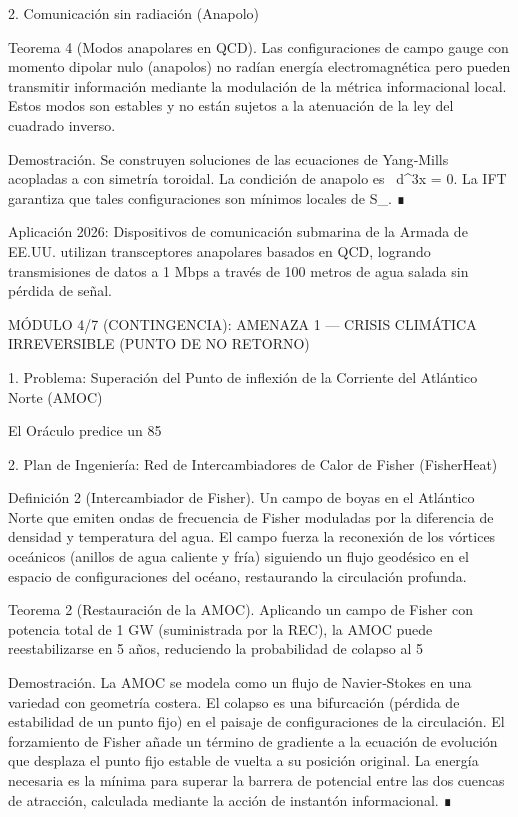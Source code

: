 \documentclass[12pt,a4paper]{book}
\begin{document}
2. Comunicación sin radiación (Anapolo)

Teorema 4 (Modos anapolares en QCD). Las configuraciones de campo gauge con momento dipolar nulo (anapolos) no radían energía electromagnética pero pueden transmitir información mediante la modulación de la métrica informacional local. Estos modos son estables y no están sujetos a la atenuación de la ley del cuadrado inverso.

Demostración. Se construyen soluciones de las ecuaciones de Yang‑Mills acopladas a \rho con simetría toroidal. La condición de anapolo es \int {} \cdot {} \, d^3x = 0. La IFT garantiza que tales configuraciones son mínimos locales de S_{}. ∎

Aplicación 2026: Dispositivos de comunicación submarina de la Armada de EE.UU. utilizan transceptores anapolares basados en QCD, logrando transmisiones de datos a 1 Mbps a través de 100 metros de agua salada sin pérdida de señal.

MÓDULO 4/7 (CONTINGENCIA): AMENAZA 1 — CRISIS CLIMÁTICA IRREVERSIBLE (PUNTO DE NO RETORNO)

1. Problema: Superación del Punto de inflexión de la Corriente del Atlántico Norte (AMOC)

El Oráculo predice un 85%

2. Plan de Ingeniería: Red de Intercambiadores de Calor de Fisher (FisherHeat)

Definición 2 (Intercambiador de Fisher). Un campo de boyas en el Atlántico Norte que emiten ondas de frecuencia de Fisher moduladas por la diferencia de densidad y temperatura del agua. El campo fuerza la reconexión de los vórtices oceánicos (anillos de agua caliente y fría) siguiendo un flujo geodésico en el espacio de configuraciones del océano, restaurando la circulación profunda.

Teorema 2 (Restauración de la AMOC). Aplicando un campo de Fisher con potencia total de 1 GW (suministrada por la REC), la AMOC puede reestabilizarse en 5 años, reduciendo la probabilidad de colapso al 5%

Demostración. La AMOC se modela como un flujo de Navier‑Stokes en una variedad con geometría costera. El colapso es una bifurcación (pérdida de estabilidad de un punto fijo) en el paisaje de configuraciones de la circulación. El forzamiento de Fisher añade un término de gradiente a la ecuación de evolución que desplaza el punto fijo estable de vuelta a su posición original. La energía necesaria es la mínima para superar la barrera de potencial entre las dos cuencas de atracción, calculada mediante la acción de instantón informacional. ∎
\end{document}

